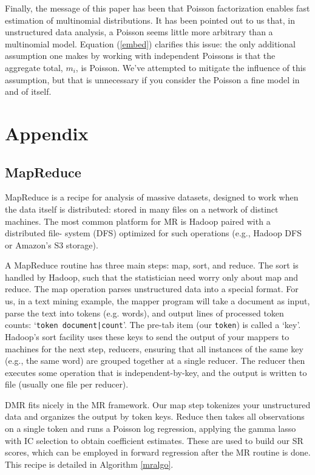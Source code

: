 \documentclass[12pt]{article}
\newcommand{\cd}[1]{{\tt#1}}
\begin{document}
Finally, the message of this paper has been that Poisson factorization
enables fast estimation of multinomial distributions.  It has been pointed out
to us that, in unstructured data analysis, a Poisson seems little more
arbitrary than a multinomial model.  Equation (\ref{embed}) clarifies this
issue:  the only additional assumption one makes by working with independent
Poissons is that the aggregate total, $m_i$, is Poisson.  We've attempted to
mitigate the influence of this assumption, but that is unnecessary if you
consider the Poisson a fine model in and of itself.

\appendix
\section{Appendix}

\subsection{MapReduce} 
\label{MR}

  MapReduce \citep[MR;][]{dean_mapreduce:_2004} is a  recipe
for analysis of massive datasets, designed to work when the data itself is
distributed: stored in many files on a network of distinct machines.
The most common platform for  MR is Hadoop paired with a distributed file-
system (DFS)  optimized for such operations (e.g., Hadoop DFS or
Amazon's S3 storage).

A MapReduce routine has three main steps: map, sort, and reduce.  The sort  is handled by 
Hadoop, such that the statistician need worry only about map and reduce.  The map operation parses  unstructured data into a special format.  For us, in a text mining example, the mapper program will take a document as input, parse the text into tokens (e.g. words), and output lines of processed token counts: `\cd{token   document|count}'.  The pre-tab item (our \cd{token}) is called a `key'.  Hadoop's sort facility uses these keys to send the output of your mappers to machines for the next step, reducers, ensuring that all instances of the same key (e.g., the same word) are grouped together at a single reducer.  The reducer then executes some operation that is independent-by-key, and the output is written to file (usually one file per reducer).

DMR fits nicely in the MR framework.  Our map step tokenizes your unstructured data  and organizes the output by token keys.  Reduce then takes all observations on a single token and runs a Poisson log regression, applying the gamma lasso with IC selection to obtain coefficient estimates.  These are used to build our SR scores, which can be employed in forward regression after the MR routine is done.  This recipe is detailed in Algorithm \ref{mralgo}.
\end{document}
